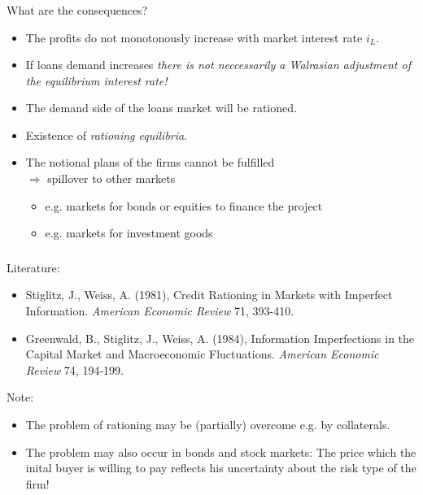\documentclass[11pt]{beamer}
\begin{document}
\begin{frame}
\frametitle{\insertsection}

What are the consequences?

\begin{itemize}
\item The profits do not monotonously increase with market interest rate $i_L$.

\item If loans demand increases \textit{there is not neccessarily a Walrasian adjustment of the equilibrium interest rate! }

\item The demand side of the loans market will be rationed.

\item Existence of \textit{rationing equilibria}.

\item The notional plans of the firms cannot be fulfilled \\
$\Rightarrow$ spillover to other markets
\begin{itemize}
\item  e.g. markets for bonds or equities to finance the project
\item  e.g. markets for investment goods
\end{itemize}

\end{itemize}

\end{frame}


\begin{frame}
\frametitle{\insertsection}

Literature:
\par\bigskip

\begin{itemize}
\item Stiglitz, J., Weiss, A. (1981), Credit Rationing in Markets with Imperfect Information. \textit{American Economic Review} 71, 393-410.
\item Greenwald, B., Stiglitz, J., Weiss, A.  (1984), Information Imperfections in the Capital Market and Macroeconomic Fluctuations. \textit{American Economic Review} 74, 194-199.
\end{itemize}
\par\bigskip

Note:

\begin{itemize}
\item The problem of rationing may be (partially) overcome e.g. by collaterals.

\item The problem may also occur in bonds and stock markets: The price which the inital buyer is willing to pay reflects his uncertainty about the risk type of the firm!
\end{itemize}

\end{frame}
\end{document}
